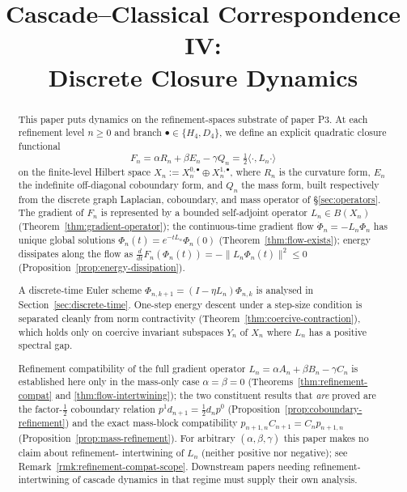\documentclass[11pt, a4paper]{amsart}
\title{Cascade--Classical Correspondence IV:\\
  Discrete Closure Dynamics}
\author{}
\date{}
\theoremstyle{definition}
\begin{document}
\maketitle

\begin{abstract}
This paper puts dynamics on the refinement-spaces substrate of paper
P3. At each refinement level $n \geq 0$ and branch $\bullet \in
\{H_4, D_4\}$, we define an explicit quadratic closure functional
\[
  F_n = \alpha R_n + \beta E_n - \gamma Q_n
    = \tfrac{1}{2} \langle \cdot, L_n \cdot \rangle
\]
on the finite-level Hilbert space $X_n := X_n^{0, \bullet} \oplus
X_n^{1, \bullet}$, where $R_n$ is the curvature form, $E_n$ the
indefinite off-diagonal coboundary form, and $Q_n$ the mass form,
built respectively from the discrete graph Laplacian, coboundary,
and mass operator of \S\ref{sec:operators}. The
gradient of $F_n$ is represented by a bounded self-adjoint
operator $L_n \in B(X_n)$
(Theorem~\ref{thm:gradient-operator}); the continuous-time gradient
flow $\dot\Phi_n = -L_n \Phi_n$ has unique global solutions
$\Phi_n(t) = e^{-t L_n} \Phi_n(0)$
(Theorem~\ref{thm:flow-exists}); energy dissipates along the flow
as $\frac{d}{dt} F_n(\Phi_n(t)) = -\|L_n \Phi_n(t)\|^2 \leq 0$
(Proposition~\ref{prop:energy-dissipation}).

A discrete-time Euler scheme $\Phi_{n, k+1} = (I - \eta L_n)
\Phi_{n, k}$ is analysed in
Section~\ref{sec:discrete-time}. One-step energy descent under a
step-size condition is separated cleanly from norm contractivity
(Theorem~\ref{thm:coercive-contraction}), which holds only on
coercive invariant subspaces $Y_n$ of $X_n$ where $L_n$ has a
positive spectral gap.

Refinement compatibility of the full gradient operator
$L_n = \alpha A_n + \beta B_n - \gamma C_n$ is established here
only in the mass-only case $\alpha = \beta = 0$
(Theorems~\ref{thm:refinement-compat} and
\ref{thm:flow-intertwining}); the two constituent results that
\emph{are} proved are the factor-$\tfrac{1}{2}$ coboundary
relation $p^1 d_{n+1} = \tfrac{1}{2} d_n p^0$
(Proposition~\ref{prop:coboundary-refinement}) and the exact
mass-block compatibility $p_{n+1, n} C_{n+1} = C_n p_{n+1, n}$
(Proposition~\ref{prop:mass-refinement}). For arbitrary $(\alpha,
\beta, \gamma)$ this paper makes no claim about refinement-
intertwining of $L_n$ (neither positive nor negative); see
Remark~\ref{rmk:refinement-compat-scope}. Downstream papers
needing refinement-intertwining of cascade dynamics in that
regime must supply their own analysis.


\end{abstract}
\end{document}

